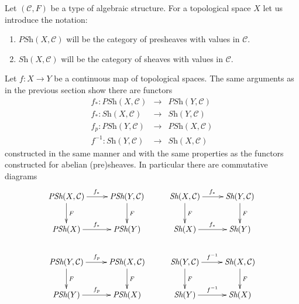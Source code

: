\noindent
Let $(\mathcal{C}, F)$ be a type of algebraic structure.
For a topological space $X$ let us introduce the notation:
\begin{enumerate}
\item $\textit{PSh}(X, \mathcal{C})$ will be the category
of presheaves with values in $\mathcal{C}$.
\item $\textit{Sh}(X, \mathcal{C})$ will be the category
of sheaves with values in $\mathcal{C}$.
\end{enumerate}
Let $f : X \to Y$ be a continuous map of topological spaces.
The same arguments as in the previous section show
there are functors
\begin{eqnarray*}
f_* : \textit{PSh}(X, \mathcal{C}) &
\longrightarrow &
\textit{PSh}(Y, \mathcal{C}) \\
f_* : \textit{Sh}(X, \mathcal{C}) &
\longrightarrow &
\textit{Sh}(Y, \mathcal{C}) \\
f_p : \textit{PSh}(Y, \mathcal{C}) &
\longrightarrow &
\textit{PSh}(X, \mathcal{C}) \\
f^{-1} : \textit{Sh}(Y, \mathcal{C}) &
\longrightarrow &
\textit{Sh}(X, \mathcal{C})
\end{eqnarray*}
constructed in the same manner and with the same
properties as the functors constructed for abelian
(pre)sheaves. In particular there are commutative diagrams
$$
\xymatrix{
\textit{PSh}(X, \mathcal{C}) \ar[r]^{f_*} \ar[d]^F &
\textit{PSh}(Y, \mathcal{C}) \ar[d]^F &
\textit{Sh}(X, \mathcal{C}) \ar[r]^{f_*} \ar[d]^F &
\textit{Sh}(Y, \mathcal{C}) \ar[d]^F
\\
\textit{PSh}(X) \ar[r]^{f_*} &
\textit{PSh}(Y) &
\textit{Sh}(X) \ar[r]^{f_*} &
\textit{Sh}(Y)
\\
\textit{PSh}(Y, \mathcal{C}) \ar[r]^{f_p} \ar[d]^F &
\textit{PSh}(X, \mathcal{C}) \ar[d]^F &
\textit{Sh}(Y, \mathcal{C}) \ar[r]^{f^{-1}} \ar[d]^F &
\textit{Sh}(X, \mathcal{C}) \ar[d]^F
\\
\textit{PSh}(Y) \ar[r]^{f_p} &
\textit{PSh}(X) &
\textit{Sh}(Y) \ar[r]^{f^{-1}} &
\textit{Sh}(X)
}
$$

